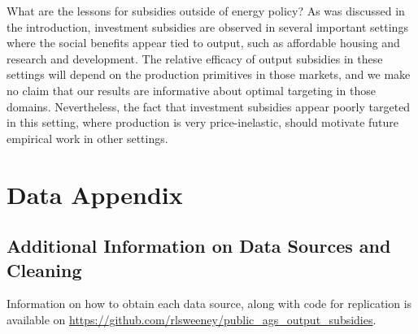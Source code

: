 \documentclass[12pt]{article}
\begin{document}
What are the lessons for subsidies outside of energy policy? As was discussed in the introduction, investment subsidies are observed in several important settings where the social benefits appear tied to output, such as affordable housing and research and development. The relative efficacy of output subsidies in these settings will depend on the production primitives in those markets, and we make no claim that our results are informative about optimal targeting in those domains. Nevertheless, the fact that investment subsidies appear poorly targeted in this setting, where production is very price-inelastic, should motivate future empirical work in other settings.

\pagebreak



\appendix
\makeatletter
\def\@seccntformat#1{\csname Pref@#1\endcsname \csname the#1\endcsname\quad}
\def\Pref@section{Appendix~}
\makeatother


\setcounter{figure}{0}  \renewcommand{\thefigure}{A.\arabic{figure}} 
\setcounter{table}{0}  \renewcommand{\thetable}{A.\arabic{table}} 

\clearpage
\section{Data Appendix \label{sec:Data_Appendix}}

\subsection{Additional Information on Data Sources and Cleaning}

Information on how to obtain each data source, along with code for replication is available on \href{https://github.com/rlsweeney/public_ags_output_subsidies}{https://github.com/rlsweeney/public\_ags\_output\_subsidies}. 
\end{document}
